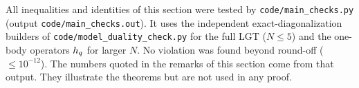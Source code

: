 \begin{remark}\label{rem:main-checks}
All inequalities and identities of this section were tested by \texttt{code/main\_checks.py} (output
\texttt{code/main\_checks.out}).  It uses the independent exact-diagonalization builders of \texttt{code/model\_duality\_check.py}
for the full LGT ($N\le5$) and the one-body operators $h_{q}$ for larger $N$.  No violation was found beyond round-off
($\le10^{-12}$).  The numbers quoted in the remarks of this section come from that output.  They illustrate the theorems
but are not used in any proof.
\end{remark}
